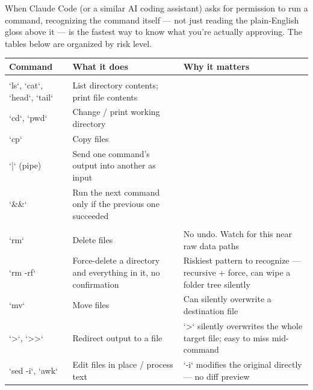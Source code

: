 \documentclass[
]{book}
\begin{document}
When Claude Code (or a similar AI coding assistant) asks for permission
to run a command, recognizing the command itself --- not just reading the
plain-English gloss above it --- is the fastest way to know what you're
actually approving. The tables below are organized by risk level.

\begin{table}
\centering\begingroup\fontsize{12}{14}\selectfont

\begin{tabular}[t]{>{\raggedright\arraybackslash}p{5em}|>{\raggedright\arraybackslash}p{11em}|>{\raggedright\arraybackslash}p{12em}}
\hline
Command & What it does & Why it matters\\
\hline
\multicolumn{3}{l}{\textbf{Low-risk commands}}\\
\hline
\hspace{1em}`ls`, `cat`, `head`, `tail` & List directory contents; print file contents & \\
\hline
\hspace{1em}`cd`, `pwd` & Change / print working directory & \\
\hline
\hspace{1em}`cp` & Copy files & \\
\hline
\hspace{1em}`|` (pipe) & Send one command's output into another as input & \\
\hline
\hspace{1em}`\&\&` & Run the next command only if the previous one succeeded & \\
\hline
\multicolumn{3}{l}{\textbf{High-risk commands}}\\
\hline
\hspace{1em}`rm` & Delete files & No undo. Watch for this near raw data paths\\
\hline
\hspace{1em}`rm -rf` & Force-delete a directory and everything in it, no confirmation & Riskiest pattern to recognize — recursive + force, can wipe a folder tree silently\\
\hline
\hspace{1em}`mv` & Move files & Can silently overwrite a destination file\\
\hline
\hspace{1em}`>`, `>>` & Redirect output to a file & `>` silently overwrites the whole target file; easy to miss mid-command\\
\hline
\hspace{1em}`sed -i`, `awk` & Edit files in place / process text & `-i` modifies the original directly — no diff preview\\

\end{tabular}
\end{table}
\end{document}
